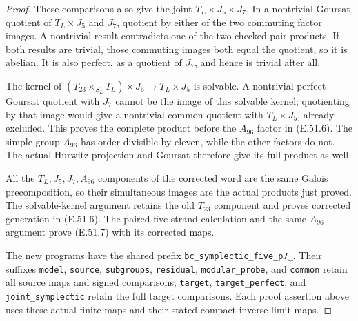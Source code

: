 \begin{proof}
These comparisons also give the joint
$T_L\times J_5\times J_7$.  In a nontrivial
Goursat quotient of $T_L\times J_5$ and $J_7$,
quotient by either of the two commuting factor
images.  A nontrivial result contradicts one
of the two checked pair products.  If both
results are trivial, those commuting images
both equal the quotient, so it is abelian.
It is also perfect, as a quotient of $J_7$,
and hence is trivial after all.

The kernel of
$(T_{23}\times_{S_L}T_L)\times J_5
 \to T_L\times J_5$ is solvable.  A nontrivial
perfect Goursat quotient with $J_7$ cannot be
the image of this solvable kernel; quotienting
by that image would give a nontrivial common
quotient with $T_L\times J_5$, already excluded.
This proves the complete product before the
$A_{96}$ factor in \textup{(E.51.6)}.
The simple group $A_{96}$ has order divisible
by eleven, while the other factors do not.
The actual Hurwitz projection and Goursat
therefore give its full product as well.

All the $T_L,J_5,J_7,A_{96}$ components of
the corrected word are the same Galois
precomposition, so their simultaneous images
are the actual products just proved.  The
solvable-kernel argument retains the old
$T_{23}$ component and proves corrected
generation in \textup{(E.51.6)}.  The paired
five-strand calculation and the same
$A_{96}$ argument prove
\textup{(E.51.7)} with its corrected maps.

The new programs have the shared prefix
\texttt{bc\_symplectic\_five\_p7\_}.
Their suffixes \texttt{model}, \texttt{source},
\texttt{subgroups}, \texttt{residual},
\texttt{modular\_probe}, and \texttt{common}
retain all source maps and signed comparisons;
\texttt{target}, \texttt{target\_perfect}, and
\texttt{joint\_symplectic} retain the full
target comparisons.  Each proof assertion
above uses these actual finite maps and
their stated compact inverse-limit maps.
\end{proof}
